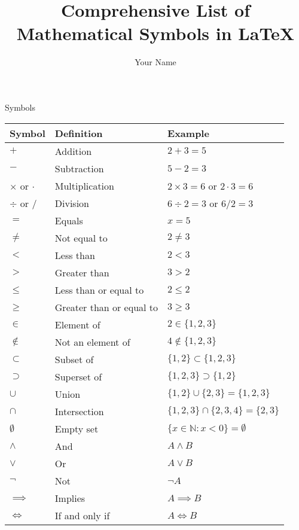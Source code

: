 \documentclass{article}
\title{Comprehensive List of Mathematical Symbols in LaTeX}
\author{Your Name}
\date{}
\begin{document}
\maketitle Symbols

\begin{longtable}{|p{}|p{}|p{}|}
\hline
\textbf{Symbol} & \textbf{Definition} & \textbf{Example} \\
\hline
\endhead

$+$ & Addition & $2 + 3 = 5$ \\
\hline
$-$ & Subtraction & $5 - 2 = 3$ \\
\hline
$\times$ or $\cdot$ & Multiplication & $2 \times 3 = 6$ or $2 \cdot 3 = 6$ \\
\hline
$\div$ or $/$ & Division & $6 \div 2 = 3$ or $6 / 2 = 3$ \\
\hline

$=$ & Equals & $x = 5$ \\
\hline
$\neq$ & Not equal to & $2 \neq 3$ \\
\hline
$<$ & Less than & $2 < 3$ \\
\hline
$>$ & Greater than & $3 > 2$ \\
\hline
$\leq$ & Less than or equal to & $2 \leq 2$ \\
\hline
$\geq$ & Greater than or equal to & $3 \geq 3$ \\
\hline

$\in$ & Element of & $2 \in \{1,2,3\}$ \\
\hline
$\notin$ & Not an element of & $4 \notin \{1,2,3\}$ \\
\hline
$\subset$ & Subset of & $\{1,2\} \subset \{1,2,3\}$ \\
\hline
$\supset$ & Superset of & $\{1,2,3\} \supset \{1,2\}$ \\
\hline
$\cup$ & Union & $\{1,2\} \cup \{2,3\} = \{1,2,3\}$ \\
\hline
$\cap$ & Intersection & $\{1,2,3\} \cap \{2,3,4\} = \{2,3\}$ \\
\hline
$\emptyset$ & Empty set & $\{x \in \mathbb{N} : x < 0\} = \emptyset$ \\
\hline

$\wedge$ & And & $A \wedge B$ \\
\hline
$\vee$ & Or & $A \vee B$ \\
\hline
$\neg$ & Not & $\neg A$ \\
\hline
$\implies$ & Implies & $A \implies B$ \\
\hline
$\iff$ & If and only if & $A \iff B$ \\
\hline


\end{longtable}
\end{document}
